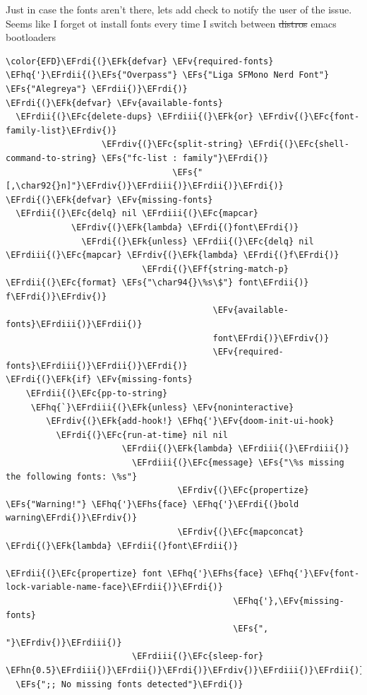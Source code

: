 \documentclass{scrartcl}
\newcommand{\EFk}[1]{\textcolor{EFk}{#1}} %
\newcommand{\EFs}[1]{\textcolor{EFs}{#1}} %
\newcommand{\EFc}[1]{\textcolor{EFc}{#1}} %
\newcommand{\EFv}[1]{\textcolor{EFv}{#1}} %
\newcommand{\EFf}[1]{\textcolor{EFf}{#1}} %
\newcommand{\EFhn}[1]{#1} %
\newcommand{\EFhq}[1]{#1} %
\newcommand{\EFhs}[1]{#1} %
\newcommand{\EFrdi}[1]{#1} %
\newcommand{\EFrdii}[1]{#1} %
\newcommand{\EFrdiii}[1]{#1} %
\newcommand{\EFrdiv}[1]{#1} %
\begin{document}
Just in case the fonts aren't there, lets add check to notify the user of the
issue. Seems like I forget ot install fonts every time I switch between \sout{distros}
emacs bootloaders
\begin{Code}
\begin{Verbatim}[]
\color{EFD}\EFrdi{(}\EFk{defvar} \EFv{required-fonts} \EFhq{'}\EFrdii{(}\EFs{"Overpass"} \EFs{"Liga SFMono Nerd Font"} \EFs{"Alegreya"} \EFrdii{)}\EFrdi{)}
\EFrdi{(}\EFk{defvar} \EFv{available-fonts}
  \EFrdii{(}\EFc{delete-dups} \EFrdiii{(}\EFk{or} \EFrdiv{(}\EFc{font-family-list}\EFrdiv{)}
                   \EFrdiv{(}\EFc{split-string} \EFrdi{(}\EFc{shell-command-to-string} \EFs{"fc-list : family"}\EFrdi{)}
                                 \EFs{"[,\char92{}n]"}\EFrdiv{)}\EFrdiii{)}\EFrdii{)}\EFrdi{)}
\EFrdi{(}\EFk{defvar} \EFv{missing-fonts}
  \EFrdii{(}\EFc{delq} nil \EFrdiii{(}\EFc{mapcar}
             \EFrdiv{(}\EFk{lambda} \EFrdi{(}font\EFrdi{)}
               \EFrdi{(}\EFk{unless} \EFrdii{(}\EFc{delq} nil \EFrdiii{(}\EFc{mapcar} \EFrdiv{(}\EFk{lambda} \EFrdi{(}f\EFrdi{)}
                           \EFrdi{(}\EFf{string-match-p} \EFrdii{(}\EFc{format} \EFs{"\char94{}\%s\$"} font\EFrdii{)} f\EFrdi{)}\EFrdiv{)}
                                         \EFv{available-fonts}\EFrdiii{)}\EFrdii{)}
                                         font\EFrdi{)}\EFrdiv{)}
                                         \EFv{required-fonts}\EFrdiii{)}\EFrdii{)}\EFrdi{)}
\EFrdi{(}\EFk{if} \EFv{missing-fonts}
    \EFrdii{(}\EFc{pp-to-string}
     \EFhq{`}\EFrdiii{(}\EFk{unless} \EFv{noninteractive}
        \EFrdiv{(}\EFk{add-hook!} \EFhq{'}\EFv{doom-init-ui-hook}
          \EFrdi{(}\EFc{run-at-time} nil nil
                       \EFrdii{(}\EFk{lambda} \EFrdiii{(}\EFrdiii{)}
                         \EFrdiii{(}\EFc{message} \EFs{"\%s missing the following fonts: \%s"}
                                  \EFrdiv{(}\EFc{propertize} \EFs{"Warning!"} \EFhq{'}\EFhs{face} \EFhq{'}\EFrdi{(}bold warning\EFrdi{)}\EFrdiv{)}
                                  \EFrdiv{(}\EFc{mapconcat} \EFrdi{(}\EFk{lambda} \EFrdii{(}font\EFrdii{)}
                                               \EFrdii{(}\EFc{propertize} font \EFhq{'}\EFhs{face} \EFhq{'}\EFv{font-lock-variable-name-face}\EFrdii{)}\EFrdi{)}
                                             \EFhq{'},\EFv{missing-fonts}
                                             \EFs{", "}\EFrdiv{)}\EFrdiii{)}
                         \EFrdiii{(}\EFc{sleep-for} \EFhn{0.5}\EFrdiii{)}\EFrdii{)}\EFrdi{)}\EFrdiv{)}\EFrdiii{)}\EFrdii{)}
  \EFs{";; No missing fonts detected"}\EFrdi{)}
\end{Verbatim}
\end{Code}
\end{document}
